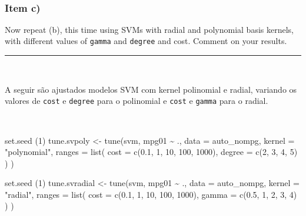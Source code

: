 \documentclass[
  a4paperpaper,
]{article}
\newenvironment{Shaded}{\begin{snugshade}}{\end{snugshade}}
\newcommand{\AttributeTok}[1]{\textcolor[rgb]{0.40,0.45,0.13}{#1}}
\newcommand{\DecValTok}[1]{\textcolor[rgb]{0.68,0.00,0.00}{#1}}
\newcommand{\FloatTok}[1]{\textcolor[rgb]{0.68,0.00,0.00}{#1}}
\newcommand{\FunctionTok}[1]{\textcolor[rgb]{0.28,0.35,0.67}{#1}}
\newcommand{\NormalTok}[1]{\textcolor[rgb]{0.00,0.23,0.31}{#1}}
\newcommand{\OtherTok}[1]{\textcolor[rgb]{0.00,0.23,0.31}{#1}}
\newcommand{\SpecialCharTok}[1]{\textcolor[rgb]{0.37,0.37,0.37}{#1}}
\newcommand{\StringTok}[1]{\textcolor[rgb]{0.13,0.47,0.30}{#1}}
\begin{document}
~

\subsubsection{Item c)}\label{item-c}

Now repeat (b), this time using SVMs with radial and polynomial basis
kernels, with different values of \texttt{gamma} and \texttt{degree} and
cost. Comment on your results.

\begin{center}\rule{0.5\linewidth}{0.5pt}\end{center}

~

A seguir são ajustados modelos SVM com kernel polinomial e radial,
variando os valores de \texttt{cost} e \texttt{degree} para o polinomial
e \texttt{cost} e \texttt{gamma} para o radial.

~

\begin{Shaded}
\begin{Highlighting}[]
\FunctionTok{set.seed}\NormalTok{ (}\DecValTok{1}\NormalTok{)}
\NormalTok{tune.svpoly }\OtherTok{\textless{}{-}} \FunctionTok{tune}\NormalTok{(svm, mpg01 }\SpecialCharTok{\textasciitilde{}}\NormalTok{ ., }\AttributeTok{data =}\NormalTok{ auto\_nompg,}
                   \AttributeTok{kernel =} \StringTok{"polynomial"}\NormalTok{,}
                   \AttributeTok{ranges =} \FunctionTok{list}\NormalTok{(}
                     \AttributeTok{cost =} \FunctionTok{c}\NormalTok{(}\FloatTok{0.1}\NormalTok{, }\DecValTok{1}\NormalTok{, }\DecValTok{10}\NormalTok{, }\DecValTok{100}\NormalTok{, }\DecValTok{1000}\NormalTok{),}
                     \AttributeTok{degree =} \FunctionTok{c}\NormalTok{(}\DecValTok{2}\NormalTok{, }\DecValTok{3}\NormalTok{, }\DecValTok{4}\NormalTok{, }\DecValTok{5}\NormalTok{)}
\NormalTok{                   )}
\NormalTok{)}
\end{Highlighting}
\end{Shaded}

\begin{Shaded}
\begin{Highlighting}[]
\FunctionTok{set.seed}\NormalTok{ (}\DecValTok{1}\NormalTok{)}
\NormalTok{tune.svradial }\OtherTok{\textless{}{-}} \FunctionTok{tune}\NormalTok{(svm, mpg01 }\SpecialCharTok{\textasciitilde{}}\NormalTok{ ., }\AttributeTok{data =}\NormalTok{ auto\_nompg,}
                   \AttributeTok{kernel =} \StringTok{"radial"}\NormalTok{,}
                   \AttributeTok{ranges =} \FunctionTok{list}\NormalTok{(}
                     \AttributeTok{cost =} \FunctionTok{c}\NormalTok{(}\FloatTok{0.1}\NormalTok{, }\DecValTok{1}\NormalTok{, }\DecValTok{10}\NormalTok{, }\DecValTok{100}\NormalTok{, }\DecValTok{1000}\NormalTok{),}
                     \AttributeTok{gamma =} \FunctionTok{c}\NormalTok{(}\FloatTok{0.5}\NormalTok{, }\DecValTok{1}\NormalTok{, }\DecValTok{2}\NormalTok{, }\DecValTok{3}\NormalTok{, }\DecValTok{4}\NormalTok{)}
\NormalTok{                   )}
\NormalTok{)}
\end{Highlighting}
\end{Shaded}
\end{document}
